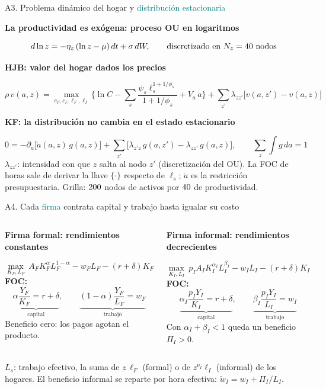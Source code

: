 \documentclass[aspectratio=169,11pt]{beamer}
\newcommand{\teal}[1]{\textcolor{Teal}{#1}}
\newcommand{\labeltext}[1]{\par{\small\bfseries\color{Blue}#1\par}\vspace{1mm}}
\newcommand{\panel}[3]{\begingroup\setlength{\fboxsep}{2.5mm}\colorbox{#1}{\begin{minipage}[t]{\dimexpr#2-5mm\relax}\raggedright #3\end{minipage}}\endgroup}
\begin{document}
\begin{frame}[label=a2]{A3. Problema dinámico del hogar y \teal{distribución estacionaria}}
\labeltext{La productividad es exógena: proceso OU en logaritmos}
\[
d\ln z=-\eta_z\,(\ln z-\mu)\,dt+\sigma\,dW,\qquad\text{discretizado en }N_z=40\text{ nodos}
\]
\labeltext{HJB: valor del hogar dados los precios}
\[
\rho\,v(a,z)=\max_{c_F,c_I,\ell_F,\ell_I}\Big\{\ln C-\sum_{s}\frac{\psi_s\ell_s^{1+1/\phi_s}}{1+1/\phi_s}+V_a\,\dot a\Big\}
+\sum_{z'}\lambda_{zz'}\big[v(a,z')-v(a,z)\big]
\]
\labeltext{KF: la distribución no cambia en el estado estacionario}
\[
0=-\partial_a\big[\dot a(a,z)\,g(a,z)\big]+\sum_{z'}\big[\lambda_{z'z}\,g(a,z')-\lambda_{zz'}\,g(a,z)\big],\qquad \textstyle\sum_z\int g\,da=1
\]
\footnotesize $\lambda_{zz'}$: intensidad con que $z$ salta al nodo $z'$ (discretización del OU). La FOC de horas sale de derivar la llave $\{\cdot\}$ respecto de $\ell_s$; $\dot a$ es la restricción presupuestaria.
Grilla: $200$ nodos de activos por $40$ de productividad.
\end{frame}

\begin{frame}[label=afirm]{A4. Cada \teal{firma} contrata capital y trabajo hasta igualar su costo}
\begin{columns}[T,onlytextwidth]
\panel{Pale}{\linewidth}{\labeltext{\color{Blue}Firma formal: rendimientos constantes}
\[
\max_{K_F,L_F}\ A_FK_F^{\alpha}L_F^{1-\alpha}-w_FL_F-(r+\delta)K_F
\]
\textbf{FOC:}
\[
\underbrace{\alpha\frac{Y_F}{K_F}=r+\delta}_{\text{capital}},\qquad
\underbrace{(1-\alpha)\frac{Y_F}{L_F}=w_F}_{\text{trabajo}}
\]
Beneficio cero: los pagos agotan el producto.}
\panel{PaleOrange}{\linewidth}{\labeltext{\color{Orange}Firma informal: rendimientos decrecientes}
\[
\max_{K_I,L_I}\ p_IA_IK_I^{\alpha_I}L_I^{\beta_I}-w_IL_I-(r+\delta)K_I
\]
\textbf{FOC:}
\[
\underbrace{\alpha_I\frac{p_IY_I}{K_I}=r+\delta}_{\text{capital}},\qquad
\underbrace{\beta_I\frac{p_IY_I}{L_I}=w_I}_{\text{trabajo}}
\]
Con $\alpha_I+\beta_I<1$ queda un beneficio $\Pi_I>0$.}
\end{columns}
\vspace{3mm}
{\footnotesize $L_s$: trabajo efectivo, la suma de $z\,\ell_F$ (formal) o de $z^{\nu_I}\ell_I$ (informal) de los hogares.
El beneficio informal se reparte por hora efectiva: $\widetilde w_I=w_I+\Pi_I/L_I$.}
\end{frame}
\end{document}
